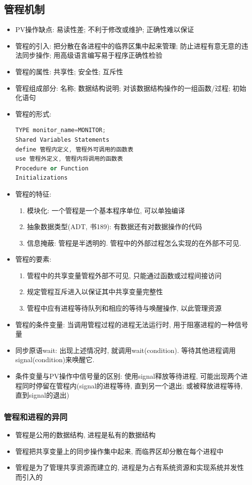 \documentclass[a4paper, UTF8]{article}
\begin{document}
\subsection{管程机制}
\begin{itemize}
\item PV操作缺点: 易读性差; 不利于修改或维护; 正确性难以保证
\item 管程的引入: 把分散在各进程中的临界区集中起来管理; 防止进程有意无意的违法同步操作; 用高级语言编写易于程序正确性检验
\item 管程的属性: 共享性; 安全性; 互斥性
\item 管程组成部分: 名称; 数据结构说明; 对该数据结构操作的一组函数/过程; 初始化语句
\item 管程的形式:
\begin{lstlisting}[language=c++]
TYPE monitor_name=MONITOR;
Shared Variables Statements
define 管程内定义, 管程外可调用的函数表
use 管程外定义, 管程内将调用的函数表 
Procedure or Function
Initializations
\end{lstlisting}
\item 管程的特征:
	\begin{enumerate}
	\item 模块化: 一个管程是一个基本程序单位, 可以单独编译
	\item 抽象数据类型(ADT, 书189): 有数据还有对数据操作的代码
	\item 信息掩蔽: 管程是半透明的. 管程中的外部过程怎么实现的在外部不可见.
	\end{enumerate}
\item 管程的要素:
	\begin{enumerate}
	\item 管程中的共享变量管程外部不可见, 只能通过函数或过程间接访问
	\item 规定管程互斥进入以保证其中共享变量完整性
	\item 管程中应有进程等待队列和相应的等待与唤醒操作, 以此管理资源
	\end{enumerate}
\item 管程的条件变量: 当调用管程过程的进程无法运行时, 用于阻塞进程的一种信号量
\item 同步原语wait: 出现上述情况时, 就调用wait(condition). 等待其他进程调用signal(condition)来唤醒它.
\item 条件变量与PV操作中信号量的区别: 使用signal释放等待进程, 可能出现两个进程同时停留在管程内(signal的进程等待, 直到另一个退出; 或被释放进程等待, 直到signal的退出)
\end{itemize}

\subsubsection{管程和进程的异同}
\begin{itemize}
\item 管程是公用的数据结构, 进程是私有的数据结构
\item 管程把共享变量上的同步操作集中起来, 而临界区却分散在每个进程中
\item 管程是为了管理共享资源而建立的, 进程是为占有系统资源和实现系统并发性而引入的
\end{itemize}
\end{document}
